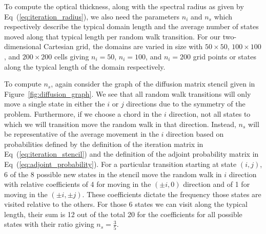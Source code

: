 \documentclass[preprint,11pt]{elsarticle}
\begin{document}
To compute the optical thickness, along with the spectral radius as given by
Eq~(\ref{eq:iteration_radius}), we also need the parameters $n_i$ and $n_s$
which respectively describe the typical domain length and the average number
of states moved along that typical length per random walk transition. For our
two-dimensional Cartesian grid, the domains are varied in size with $50 \times
50$, $100 \times 100$, and $200 \times 200$ cells giving $n_i=50$, $n_i=100$,
and $n_i=200$ grid points or states along the typical length of the domain
respectively.

To compute $n_s$, again consider the graph of the diffusion matrix stencil
given in Figure~\ref{fig:diffusion_graph}. We see that all random walk
transitions will only move a single state in either the $i$ or $j$ directions
due to the symmetry of the problem. Furthermore, if we choose a chord in the
$i$ direction, not all states to which we will transition move the random walk
in that direction. Instead, $n_s$ will be representative of the average
movement in the $i$ direction based on probabilities defined by the definition
of the iteration matrix in Eq~(\ref{eq:iteration_stencil}) and the definition
of the adjoint probability matrix in Eq~(\ref{eq:adjoint_probability}). For a
particular transition starting at state $(i,j)$, 6 of the 8 possible new
states in the stencil move the random walk in $i$ direction with relative
coefficients of 4 for moving in the $(\pm i,0)$ direction and of 1 for moving
in the $(\pm i,\pm j)$. These coefficients dictate the frequency those states
are visited relative to the others. For those 6 states we can visit along the
typical length, their sum is 12 out of the total 20 for the coefficients for
all possible states with their ratio giving $n_s = \frac{3}{5}$.
\end{document}
